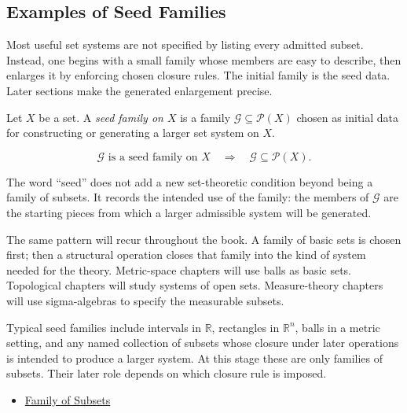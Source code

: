 \subsection{Examples of Seed Families}

\begin{remark*}[Exposition]
Most useful set systems are not specified by listing every admitted subset.
Instead, one begins with a small family whose members are easy to describe,
then enlarges it by enforcing chosen closure rules.  The initial family is the
seed data.  Later sections make the generated enlargement precise.
\end{remark*}

\begin{definition}\label{def:seed-family}
Let \(X\) be a set.  A \emph{seed family on \(X\)} is a family
\(\mathcal{G}\subseteq\mathcal{P}(X)\) chosen as initial data for constructing
or generating a larger set system on \(X\).
\end{definition}

\begin{remark*}
\[
  \mathcal{G}\text{ is a seed family on }X
  \quad\Longrightarrow\quad
  \mathcal{G}\subseteq\mathcal{P}(X).
\]
\end{remark*}

\begin{remark*}[Interpretation]
The word ``seed'' does not add a new set-theoretic condition beyond being a
family of subsets.  It records the intended use of the family: the members of
\(\mathcal{G}\) are the starting pieces from which a larger admissible system
will be generated.
\end{remark*}

\begin{remark*}[Exposition]
The same pattern will recur throughout the book.  A family of basic sets is
chosen first; then a structural operation closes that family into the kind of
system needed for the theory.  Metric-space chapters will use balls as basic
sets.  Topological chapters will study systems of open sets.  Measure-theory
chapters will use sigma-algebras to specify the measurable subsets.
\end{remark*}

\begin{remark*}[Examples]
Typical seed families include intervals in \(\mathbb{R}\), rectangles in
\(\mathbb{R}^{n}\), balls in a metric setting, and any named collection of
subsets whose closure under later operations is intended to produce a larger
system.  At this stage these are only families of subsets.  Their later role
depends on which closure rule is imposed.
\end{remark*}

\begin{dependencies}
\begin{itemize}
  \item \hyperref[def:family-of-subsets]{Family of Subsets}
\end{itemize}
\end{dependencies}
